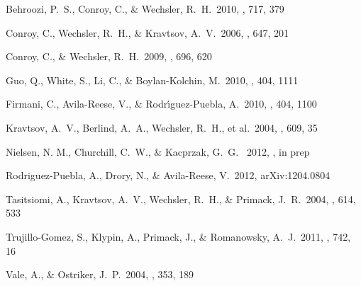 \documentclass{emulateapj}
\begin{document}
\begin{thebibliography}{}

Behroozi, P.~S., Conroy, C., \& Wechsler, R.~H.\ 2010, \apj, 717, 379

 Conroy, C., Wechsler, R.~H.,
\& Kravtsov, A.~V.\ 2006, \apj, 647, 201

 Conroy, C., \&
Wechsler, R.~H.\ 2009, \apj, 696, 620

 Guo, Q., White, S., Li, C., 
\& Boylan-Kolchin, M.\ 2010, \mnras, 404, 1111 

 Firmani, C., Avila-Reese,
V., \& Rodr{\'{\i}}guez-Puebla, A.\ 2010, \mnras, 404, 1100

 Kravtsov, A.~V., Berlind,
A.~A., Wechsler, R.~H., et al.\ 2004, \apj, 609, 35

Nielsen, N. M., Churchill, C.~W., \& Kacprzak, G.~G. \ 2012, \apjl, in prep

Rodriguez-Puebla, A., Drory, N., \& Avila-Reese, V.\ 2012, arXiv:1204.0804 

 Tasitsiomi, A.,
Kravtsov, A.~V., Wechsler, R.~H., \& Primack, J.~R.\ 2004, \apj, 614,
533

Trujillo-Gomez, S., Klypin, A., Primack, J., \& Romanowsky, A.~J.\
2011, \apj, 742, 16

 Vale, A., \& Ostriker, J.~P.\
2004, \mnras, 353, 189








\end{thebibliography}
\end{document}
